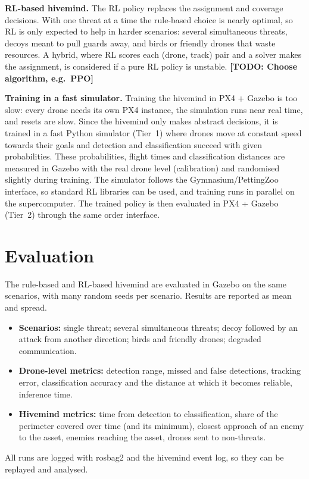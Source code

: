 \documentclass{article}
\newcommand{\todo}[1]{\textbf{[TODO: #1]}}
\begin{document}
\textbf{RL-based hivemind.} The RL policy replaces the assignment and
coverage decisions. With one threat at a time the rule-based choice is
nearly optimal, so RL is only expected to help in harder scenarios: several
simultaneous threats, decoys meant to pull guards away, and birds or
friendly drones that waste resources. A hybrid, where RL scores each
(drone, track) pair and a solver makes the assignment, is considered if a
pure RL policy is unstable. \todo{Choose algorithm, e.g.\ PPO}

\textbf{Training in a fast simulator.} Training the hivemind in PX4 +
Gazebo is too slow: every drone needs its own PX4 instance, the simulation
runs near real time, and resets are slow. Since the hivemind only makes
abstract decisions, it is trained in a fast Python simulator (Tier~1) where
drones move at constant speed towards their goals and detection and
classification succeed with given probabilities. These probabilities,
flight times and classification distances are measured in Gazebo with the
real drone level (calibration) and randomised slightly during training.
The simulator follows the Gymnasium/PettingZoo interface, so standard RL
libraries can be used, and training runs in parallel on the supercomputer.
The trained policy is then evaluated in PX4 + Gazebo (Tier~2) through the
same order interface.

\section{Evaluation}
The rule-based and RL-based hivemind are evaluated in Gazebo on the same
scenarios, with many random seeds per scenario. Results are reported as
mean and spread.
\begin{itemize}
    \item \textbf{Scenarios:} single threat; several simultaneous threats;
          decoy followed by an attack from another direction; birds and
          friendly drones; degraded communication.
    \item \textbf{Drone-level metrics:} detection range, missed and false
          detections, tracking error, classification accuracy and the
          distance at which it becomes reliable, inference time.
    \item \textbf{Hivemind metrics:} time from detection to
          classification, share of the perimeter covered over time (and its
          minimum), closest approach of an enemy to the asset, enemies
          reaching the asset, drones sent to non-threats.
\end{itemize}
All runs are logged with rosbag2 and the hivemind event log, so they can be
replayed and analysed.
\end{document}
